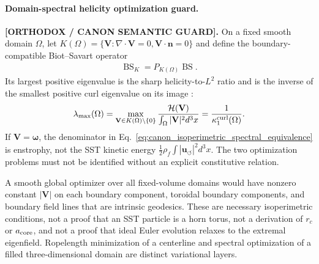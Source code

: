 \documentclass[11pt]{article}
\theoremstyle{definition}
\theoremstyle{plain}
\theoremstyle{remark}
\newcommand{\rhoF}{{\rho_{\!f}}}
\newcommand{\rc}{{r_c}}
\newcommand{\uswirl}{\mathbf{u}_{\!\boldsymbol{\circlearrowleft}}}
\begin{document}
        \paragraph{Domain-spectral helicity optimization guard.}
        \label{subsec:canon_isoperimetric_helicity_guard}
        \textbf{[ORTHODOX / CANON SEMANTIC GUARD].}
        On a fixed smooth domain $\Omega$, let
        $K(\Omega)=\{\mathbf V:\nabla\cdot\mathbf V=0,
        \mathbf V\cdot\mathbf n=0\}$ and define the boundary-compatible
        Biot--Savart operator
        \begin{align}
            \operatorname{BS}_{K}
            =P_{K(\Omega)}\operatorname{BS} .
            \label{eq:canon_projected_bs_operator}
        \end{align}
        Its largest positive eigenvalue is the sharp helicity-to-$L^2$ ratio
        and is the inverse of the smallest positive curl eigenvalue on its
        image \cite{CantarellaDeTurckGluckTeytel2000Isoperimetric}:
        \begin{align}
            \lambda_{\max}(\Omega)
            =
            \max_{\mathbf V\in K(\Omega)\setminus\{0\}}
            \frac{\mathcal H(\mathbf V)}
                 {\int_{\Omega}|\mathbf V|^2d^3x}
            =
            \frac{1}{\kappa_{1}^{\rm curl}(\Omega)} .
            \label{eq:canon_isoperimetric_spectral_equivalence}
        \end{align}
        If $\mathbf V=\boldsymbol\omega$, the denominator in
        Eq.~\eqref{eq:canon_isoperimetric_spectral_equivalence} is enstrophy,
        not the SST kinetic energy
        $\tfrac12\rhoF\int|\uswirl|^2d^3x$.  The two optimization problems must
        not be identified without an explicit constitutive relation.

        A smooth global optimizer over all fixed-volume domains would have
        nonzero constant $|\mathbf V|$ on each boundary component, toroidal
        boundary components, and boundary field lines that are intrinsic
        geodesics.  These are necessary isoperimetric conditions, not a proof
        that an SST particle is a horn torus, not a derivation of $\rc$ or
        $a_{\rm core}$, and not a proof that ideal Euler evolution relaxes to the
        extremal eigenfield.  Ropelength minimization of a centerline and
        spectral optimization of a filled three-dimensional domain are distinct
        variational layers.
\end{document}
